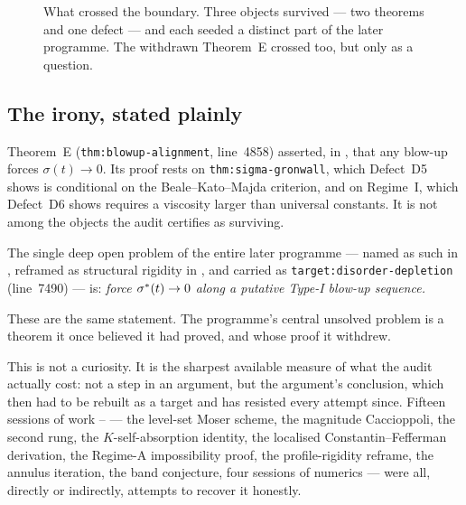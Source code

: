 \begin{figure}[ht]
\caption[The inheritance graph]{What crossed the  boundary. Three
objects survived --- two theorems and one defect --- and each seeded a
distinct part of the later programme. The withdrawn Theorem~E crossed too, but
only as a question.}
\label{fig:inheritance}
\end{figure}

\subsection{The irony, stated plainly}
\label{sec:theorem-e-irony}

\begin{record}
Theorem~E (\texttt{thm:blowup-alignment}, line~4858) asserted, in ,
that any blow-up forces \(\sigma(t)\to0\). Its proof rests on
\texttt{thm:sigma-gronwall}, which Defect~D5 shows is conditional on the
Beale--Kato--Majda criterion, and on Regime~I, which Defect~D6 shows requires
a viscosity larger than universal constants. It is not among the objects the
audit certifies as surviving.

\smallskip
The single deep open problem of the entire later programme --- named as such
in , reframed as structural rigidity in , and carried as
\texttt{target:disorder-depletion} (line~7490) --- is: \emph{force
\(\sigma^{*}(t)\to0\) along a putative Type-I blow-up sequence.}

\smallskip
These are the same statement. The programme's central unsolved problem is a
theorem it once believed it had proved, and whose proof it withdrew.
\end{record}

This is not a curiosity. It is the sharpest available measure of what the
 audit actually cost: not a step in an argument, but the argument's
conclusion, which then had to be rebuilt as a target and has resisted every
attempt since. Fifteen sessions of work -- --- the level-set
Moser scheme, the magnitude Caccioppoli, the second rung, the
\(K\)-self-absorption identity, the localised Constantin--Fefferman
derivation, the Regime-A impossibility proof, the profile-rigidity reframe,
the annulus iteration, the band conjecture, four sessions of numerics ---
were all, directly or indirectly, attempts to recover it honestly.

